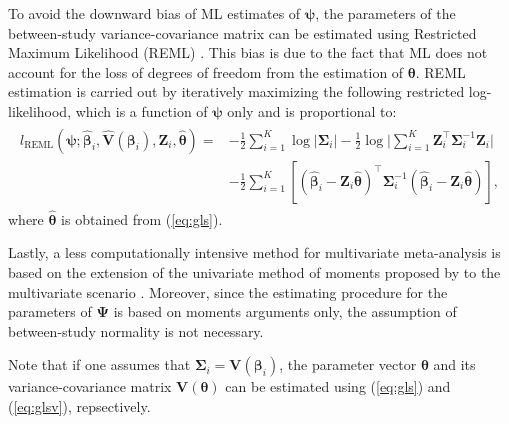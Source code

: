 To avoid the downward bias of ML estimates of $\boldsymbol{\psi}$, the parameters of the between-study variance-covariance matrix can be estimated using Restricted Maximum Likelihood (REML) \citep{white_multivariate_2011}. This bias is due to the fact that ML does not account for the loss of degrees of freedom from the estimation of $\boldsymbol{\theta}$. REML estimation is carried out by iteratively maximizing the following restricted log-likelihood,  which is a function of $\boldsymbol{\psi}$ only and is proportional to:
\begin{align*}
\begin{split}
l_{\mathrm{REML}}(\boldsymbol{\psi};\hat{\boldsymbol{\beta}}_i,\hat{\mathbf{V}}(\boldsymbol{\beta}_i),\mathbf{Z}_i, \hat{\boldsymbol{\theta}}) = &-\frac{1}{2} \sum_{i=1}^K \log | \boldsymbol{\Sigma}_i | -\frac{1}{2}  \log \bigg| \sum_{i=1}^K \mathbf{Z}_i^\top \boldsymbol{\Sigma}_i^{-1} \mathbf{Z}_i \bigg| \\
 &- \frac{1}{2} \sum_{i=1}^K \left[ \left(\hat{\boldsymbol{\beta}}_i - \mathbf{Z}_i \hat{\boldsymbol{\theta}} \right)^\top \boldsymbol{\Sigma}_i^{-1} \left(\hat{\boldsymbol{\beta}}_i - \mathbf{Z}_i \hat{\boldsymbol{\theta}} \right) \right], 
\end{split}
\end{align*}
where $\hat{\boldsymbol{\theta}}$ is obtained from (\ref{eq:gls}).

Lastly, a less computationally intensive method for multivariate meta-analysis is based on the extension of the univariate method of moments proposed by \citet{dersimonian_metaanalysis_1986} to the multivariate scenario \citep{jackson_extending_2010}. Moreover, since the estimating procedure for the parameters of $\boldsymbol{\Psi}$ is based on moments arguments only, the assumption of between-study normality is not necessary. %


Note that if one assumes that $\boldsymbol{\Sigma}_i = \mathbf{V}(\boldsymbol{\beta}_i)$, the parameter vector $\boldsymbol{\theta}$ and its  variance-covariance matrix $\mathbf{V}(\boldsymbol{\theta})$ can be estimated using (\ref{eq:gls}) and (\ref{eq:glsv}), repsectively.

 

